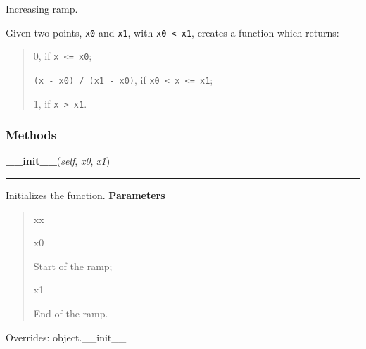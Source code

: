 Increasing ramp.

Given two points, \texttt{x0} and \texttt{x1}, with \texttt{x0 < x1}, creates a function
which returns:
%
\begin{quote}

0, if \texttt{x <= x0};

\texttt{(x - x0) / (x1 - x0)}, if \texttt{x0 < x <= x1};

1, if \texttt{x > x1}.

\end{quote}


  \subsubsection{Methods}

    \vspace{0.5ex}

\hspace{.8\funcindent}\begin{boxedminipage}{\funcwidth}

    \raggedright \textbf{\_\_init\_\_}(\textit{self}, \textit{x0}, \textit{x1})

    \vspace{-1.5ex}

    \rule{\textwidth}{0.5\fboxrule}
\setlength{\parskip}{2ex}

Initializes the function.
\setlength{\parskip}{1ex}
      \textbf{Parameters}
      \vspace{-1ex}

      \begin{quote}
        \begin{Ventry}{xx}

          \item[x0]


Start of the ramp;
          \item[x1]


End of the ramp.
        \end{Ventry}

      \end{quote}

      Overrides: object.\_\_init\_\_

    \end{boxedminipage}

